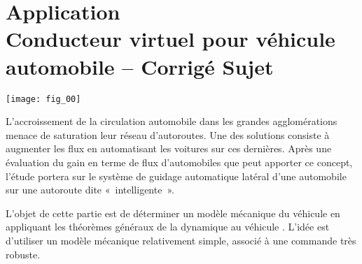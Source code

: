 \chapter*{Application  \\ 
Conducteur virtuel pour véhicule automobile -- \ifprof Corrigé \else Sujet \fi}

\iflivret {} \else
\ifprof  {} \else \fi
\fi

\setcounter{question}{0}
\begin{marginfigure}[4cm]
\texttt{[image: fig\_00]}
\end{marginfigure}




\ifprof
\else
L'accroissement de la circulation automobile dans les grandes agglomérations
menace de saturation leur réseau d'autoroutes. Une des solutions consiste à
augmenter les flux en automatisant les voitures sur ces dernières. Après une
évaluation du gain en terme de flux d'automobiles que peut apporter ce concept,
l'étude portera sur le système de guidage automatique latéral d'une automobile
sur une autoroute dite «~intelligente~».
\fi


\begin{obj}
L'objet de cette partie est de déterminer un modèle mécanique du véhicule en
appliquant les théorèmes généraux de la dynamique au véhicule . L'idée est
d'utiliser un modèle mécanique relativement simple, associé à une commande
très robuste.
\end{obj}



